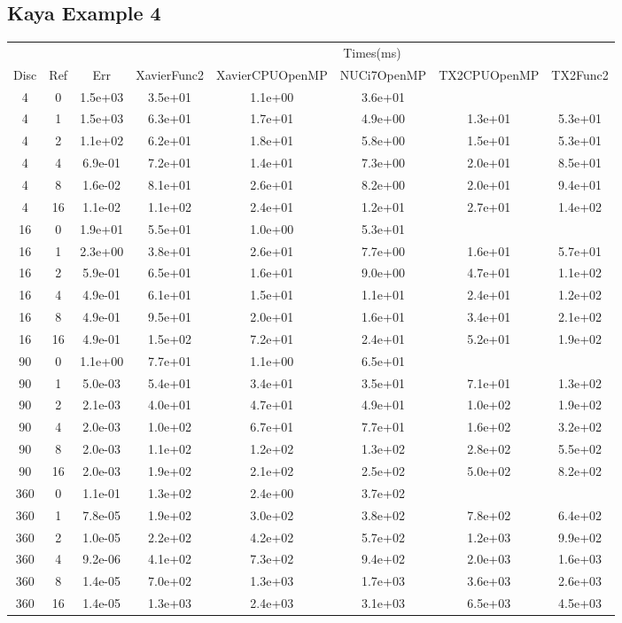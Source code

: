 \begin{landscape}
\subsection{Kaya Example 4}
\begin{center}
\begin{tabular}{c|c|c|c|c|c|c|c}
	&&&\multicolumn{5}{c}{Times(ms)}\\
	Disc&Ref&Err&XavierFunc2&XavierCPUOpenMP&NUCi7OpenMP&TX2CPUOpenMP&TX2Func2\\
\hline
4&0&1.5e+03&3.5e+01&1.1e+00&3.6e+01\\
4&1&1.5e+03&6.3e+01&1.7e+01&4.9e+00&1.3e+01&5.3e+01\\
4&2&1.1e+02&6.2e+01&1.8e+01&5.8e+00&1.5e+01&5.3e+01\\
4&4&6.9e-01&7.2e+01&1.4e+01&7.3e+00&2.0e+01&8.5e+01\\
4&8&1.6e-02&8.1e+01&2.6e+01&8.2e+00&2.0e+01&9.4e+01\\
4&16&1.1e-02&1.1e+02&2.4e+01&1.2e+01&2.7e+01&1.4e+02\\
\hline
16&0&1.9e+01&5.5e+01&1.0e+00&5.3e+01\\
16&1&2.3e+00&3.8e+01&2.6e+01&7.7e+00&1.6e+01&5.7e+01\\
16&2&5.9e-01&6.5e+01&1.6e+01&9.0e+00&4.7e+01&1.1e+02\\
16&4&4.9e-01&6.1e+01&1.5e+01&1.1e+01&2.4e+01&1.2e+02\\
16&8&4.9e-01&9.5e+01&2.0e+01&1.6e+01&3.4e+01&2.1e+02\\
16&16&4.9e-01&1.5e+02&7.2e+01&2.4e+01&5.2e+01&1.9e+02\\
\hline
90&0&1.1e+00&7.7e+01&1.1e+00&6.5e+01\\
90&1&5.0e-03&5.4e+01&3.4e+01&3.5e+01&7.1e+01&1.3e+02\\
90&2&2.1e-03&4.0e+01&4.7e+01&4.9e+01&1.0e+02&1.9e+02\\
90&4&2.0e-03&1.0e+02&6.7e+01&7.7e+01&1.6e+02&3.2e+02\\
90&8&2.0e-03&1.1e+02&1.2e+02&1.3e+02&2.8e+02&5.5e+02\\
90&16&2.0e-03&1.9e+02&2.1e+02&2.5e+02&5.0e+02&8.2e+02\\
\hline
360&0&1.1e-01&1.3e+02&2.4e+00&3.7e+02\\
360&1&7.8e-05&1.9e+02&3.0e+02&3.8e+02&7.8e+02&6.4e+02\\
360&2&1.0e-05&2.2e+02&4.2e+02&5.7e+02&1.2e+03&9.9e+02\\
360&4&9.2e-06&4.1e+02&7.3e+02&9.4e+02&2.0e+03&1.6e+03\\
360&8&1.4e-05&7.0e+02&1.3e+03&1.7e+03&3.6e+03&2.6e+03\\
360&16&1.4e-05&1.3e+03&2.4e+03&3.1e+03&6.5e+03&4.5e+03\\
\hline
\end{tabular}
\end{center}
\end{landscape}





